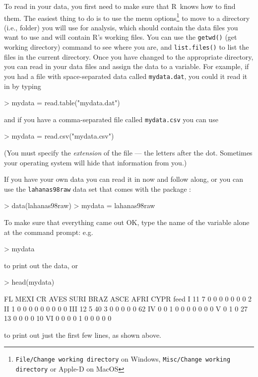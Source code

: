 \documentclass[11pt]{article}
\newcommand{\R}{{\sf R}}
\newcommand{\code}[1]{{\tt #1}}
\begin{document}
To read in your data,
you first need to make sure that \R\ knows how to
find them.
The easiest thing to do is to use the
menu options\footnote{{\tt File/Change working directory}
on Windows, {\tt Misc/Change working directory} or Apple-D
on MacOS}
to move to a directory (i.e., folder) you
will use for analysis, which should contain the data
files you want to use and will contain \R's working files.
You can use the \code{getwd()} (get working directory)
command to see where you are, and
\code{list.files()} to list the files in the current
directory.
Once you have changed to the appropriate directory,
you can read in your data files and assign the
data to a variable.
For example, if you had a file 
with space-separated data called
\code{mydata.dat}, you could it read it in 
by typing
\begin{Schunk}
\begin{Sinput}
> mydata = read.table("mydata.dat")
\end{Sinput}
\end{Schunk}
and if you
have a comma-separated file called
\code{mydata.csv} you can use
\begin{Schunk}
\begin{Sinput}
> mydata = read.csv("mydata.csv")
\end{Sinput}
\end{Schunk}
(You must specify the \emph{extension} of the
file --- the letters after the dot.  Sometimes
your operating system will hide that information
from you.)

If you have your own data you can read it in
now and follow along, or you can use the
\code{lahanas98raw}
data set that comes with the package
\cite{Laha+98}:
\begin{Schunk}
\begin{Sinput}
> data(lahanas98raw)
> mydata = lahanas98raw
\end{Sinput}
\end{Schunk}

To make sure that everything came out OK, type
the name of the variable alone at the command prompt: e.g.
\begin{Schunk}
\begin{Sinput}
> mydata
\end{Sinput}
\end{Schunk}
to print out the data, or
\begin{Schunk}
\begin{Sinput}
> head(mydata)
\end{Sinput}
\begin{Soutput}
    FL MEXI CR AVES SURI BRAZ ASCE AFRI CYPR feed
I   11    7  0    0    0    0    0    0    0    2
II   1    0  0    0    0    0    0    0    0    0
III 12    5 40    3    0    0    0    0    0   62
IV   0    0  1    0    0    0    0    0    0    0
V    0    1  0   27   13    0    0    0    0   10
VI   0    0  0    0    1    0    0    0    0    0
\end{Soutput}
\end{Schunk}
to print out just the first few lines, as shown above.
\end{document}
